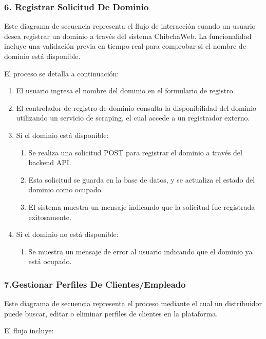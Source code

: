 \subsubsection*{6. Registrar Solicitud De Dominio}

Este diagrama de secuencia representa el flujo de interacción cuando un usuario desea registrar un dominio a través del sistema ChibchaWeb. La funcionalidad incluye una validación previa en tiempo real para comprobar si el nombre de dominio está disponible.

El proceso se detalla a continuación:

\begin{enumerate}
    \item El usuario ingresa el nombre del dominio en el formulario de registro.
    \item El controlador de registro de dominio consulta la disponibilidad del dominio utilizando un servicio de scraping, el cual accede a un registrador externo.
    \item Si el dominio está disponible:
    \begin{enumerate}
        \item Se realiza una solicitud POST para registrar el dominio a través del backend API.
        \item Esta solicitud se guarda en la base de datos, y se actualiza el estado del dominio como ocupado.
        \item El sistema muestra un mensaje indicando que la solicitud fue registrada exitosamente.
    \end{enumerate}

    \item Si el dominio no está disponible:
    \begin{enumerate}
    	\item Se muestra un mensaje de error al usuario indicando que el dominio ya está ocupado.
    \end{enumerate}
\end{enumerate}

\subsubsection*{7.Gestionar Perfiles De Clientes/Empleado}

Este diagrama de secuencia representa el proceso mediante el cual un distribuidor puede buscar, editar o eliminar perfiles de clientes en la plataforma.

El flujo incluye:

